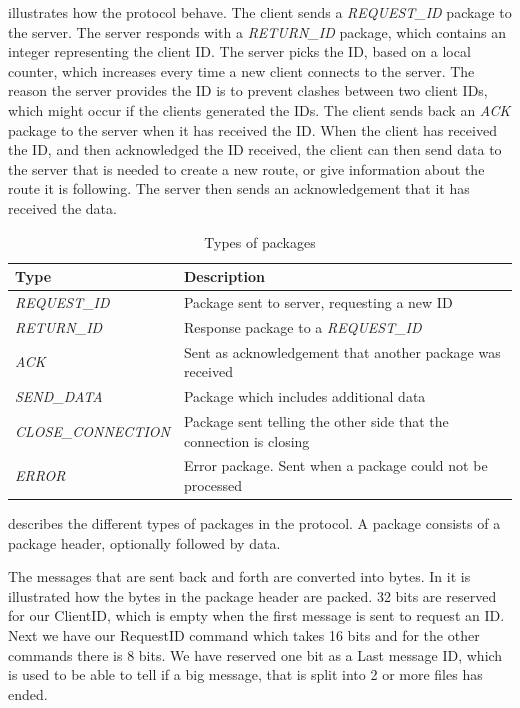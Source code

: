  illustrates how the protocol behave.
The client sends a \textit{REQUEST\_ID} package to the server.
The server responds with a \textit{RETURN\_ID} package,
which contains an integer representing the client ID.
The server picks the ID, based on a local counter, which increases every time a new client connects to the server.
The reason the server provides the ID is to prevent clashes between two client IDs,
which might occur if the clients generated the IDs.
The client sends back an \textit{ACK} package to the server when it has received the ID.
When the client has received the ID, and then acknowledged the ID received,
the client can then send data to the server that is needed to create a new route,
or give information about the route it is following.
The server then sends an acknowledgement that it has received the data.

\begin{table}
\centering
\begin{tabular}{l|p{}}
\textbf{Type}              & \textbf{Description} \\
\hline
\textit{REQUEST\_ID}       & Package sent to server, requesting a new ID \\
\hline
\textit{RETURN\_ID}        & Response package to a \textit{REQUEST\_ID} \\
\hline
\textit{ACK}               & Sent as acknowledgement that another package was received \\
\hline
\textit{SEND\_DATA}        & Package which includes additional data \\
\hline
\textit{CLOSE\_CONNECTION} & Package sent telling the other side that the connection is closing \\
\hline
\textit{ERROR}             & Error package. Sent when a package could not be processed \\
\end{tabular}
\caption{Types of packages}
\label{tab:package_types}
\end{table}

 describes the different types of packages in the protocol.
A package consists of a package header, optionally followed by data.

The messages that are sent back and forth are converted into bytes.
In  it is illustrated how the bytes in the package header are packed.
32 bits are reserved for our ClientID, which is empty when the first message is sent to request an ID.
Next we have our RequestID command which takes 16 bits and for the other commands there is 8 bits.
We have reserved one bit as a Last message ID, which is used to be able to tell if a big message,
that is split into 2 or more files has ended.

